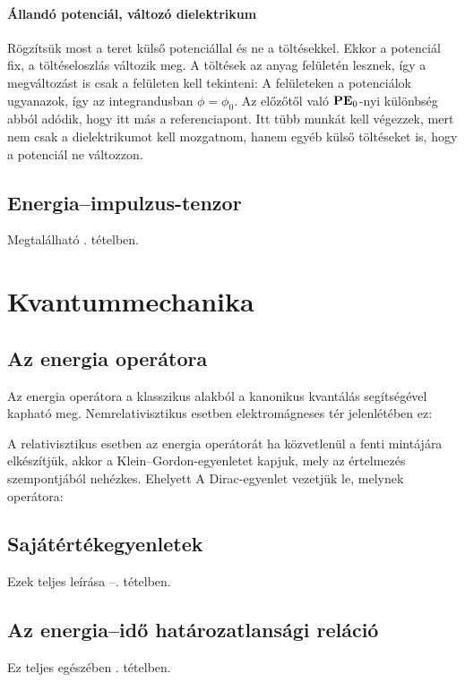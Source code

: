    \paragraph{Állandó potenciál, változó dielektrikum}
    
    Rögzítsük most a teret külső potenciállal és ne a töltésekkel. Ekkor a  potenciál fix, a töltéseloszlás változik meg. A töltések az anyag felületén lesznek, így a megváltozást is csak a felületen kell tekinteni:
    A felületeken a potenciálok ugyanazok, így az integrandusban $\phi=\phi_0$. 
    Az előzőtől való $\mathbf{P}\mathbf{E}_0$-nyi különbség abból adódik, hogy itt más a referenciapont. Itt tübb munkát kell végezzek, mert nem csak a dielektrikumot kell mozgatnom, hanem egyéb külső töltéseket is, hogy a potenciál ne változzon. 
    
    
  \subsection{Energia--impulzus-tenzor}
   
   Megtalálható . tételben.
    
 \section{Kvantummechanika}
  
  \subsection{Az energia operátora}
   
   Az energia operátora a klasszikus alakból a kanonikus kvantálás segítségével kapható meg. Nemrelativisztikus esetben elektromágneses tér jelenlétében ez:
   
   A relativisztikus esetben az energia operátorát ha közvetlenül a fenti mintájára elkészítjük, akkor a Klein--Gordon-egyenletet kapjuk, mely az értelmezés szempontjából nehézkes. Ehelyett A Dirac-egyenlet vezetjük le, melynek operátora:
   
  \subsection{Sajátértékegyenletek}
   
   Ezek teljes leírása --. tételben.
   
  \subsection{Az energia--idő határozatlansági reláció}
    
   Ez teljes egészében . tételben.
